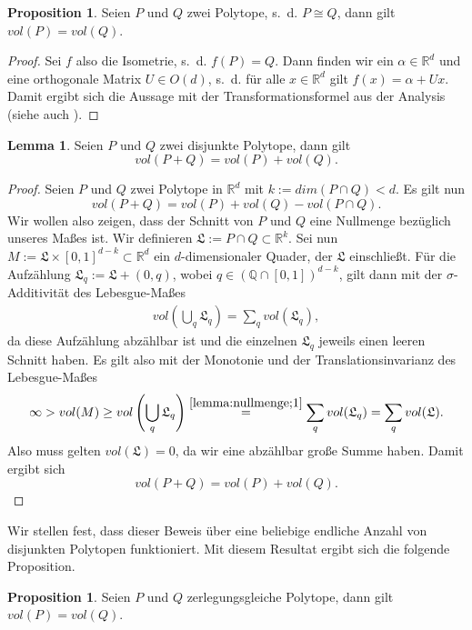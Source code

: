 \documentclass[11pt,titlepage]{article}
\newcommand{\setQ}{\mathbb{Q}}
\newcommand{\setR}{\mathbb{R}}
\theoremstyle{definition}
\newtheorem{proposition}[theorem]{Proposition}
\newtheorem{lemma}[theorem]{Lemma}
\theoremstyle{remark}
\begin{document}
	\begin{proposition} \label{prop:cong,vol}
		Seien $P$ und $Q$ zwei Polytope, s.~d. $P\cong Q$, dann gilt $vol(P)=vol(Q)$.
	\end{proposition}
	
	\begin{proof}
		Sei $f$ also die Isometrie, s.~d. $f(P)=Q$. Dann finden wir ein 
		$\alpha\in\setR^d$ und eine orthogonale Matrix $U\in O(d)$, s.~d. für 
		alle $x\in\setR^d$ gilt $f(x)=\alpha+Ux$. Damit ergibt sich die Aussage 
		mit der Transformationsformel 
		aus der Analysis (siehe auch \cite[Satz 4.7]{SkriptAna3}).
	\end{proof}
	
	\begin{lemma}\label{lemma:nullmenge}
		Seien $P$ und $Q$ zwei disjunkte Polytope, dann gilt
		\[ vol(P+Q)=vol(P)+vol(Q).\]
	\end{lemma}

	\begin{proof}
		Seien $P$ und $Q$ zwei Polytope in $\setR^d$ 
		mit $k:=dim(P\cap Q)<d$. Es gilt nun 
		\[vol(P+Q)=vol(P)+vol(Q)-vol(P\cap Q).\]
		Wir wollen also zeigen, dass der Schnitt von $P$ und $Q$ eine Nullmenge bezüglich unseres Maßes ist. 
		Wir definieren $\mathfrak{L}:=P\cap Q \subset \setR^k$. Sei nun  $M:=\mathfrak{L}\times[0,1]^{d-k}\subset\setR^d$ ein $d$-dimensionaler Quader, der 
		$\mathfrak{L}$ einschließt. Für die Aufzählung $\mathfrak{L}_q:=\mathfrak{L}+(0,q)$, wobei $q\in(\setQ\cap[0,1])^{d-k}$, gilt dann mit der $\sigma$-Additivität des Lebesgue-Maßes
		\begin{align}
			vol \left(\bigcup_q\mathfrak{L}_q\right)=\sum_q vol(\mathfrak{L}_q), \label{lemma:nullmenge;1}
		\end{align}
		da diese Aufzählung abzählbar ist und die einzelnen $\mathfrak{L}_q$ jeweils einen leeren Schnitt haben. Es gilt also mit der Monotonie und der Translationsinvarianz des Lebesgue-Maßes
		\[\infty>vol(M)\geq vol\left(\bigcup_q \mathfrak{L}_q\right)\overset{\ref{lemma:nullmenge;1}}{=}\sum_q vol(\mathfrak{L}_q)=\sum_q vol(\mathfrak{L}).\]
		Also muss gelten $vol(\mathfrak{L})=0$, da wir eine abzählbar große Summe haben. 
		Damit ergibt sich
		\[vol(P+Q)=vol(P)+vol(Q).\]
	\end{proof}

	Wir stellen fest, dass dieser Beweis über eine beliebige endliche Anzahl von disjunkten 
	Polytopen funktioniert. Mit diesem Resultat ergibt sich die folgende Proposition.
	
	\begin{proposition} \label{prop:zerl,vol}
		Seien $P$ und $Q$ zerlegungsgleiche Polytope, dann gilt $vol(P)=vol(Q)$.
	\end{proposition}
	
\end{document}
